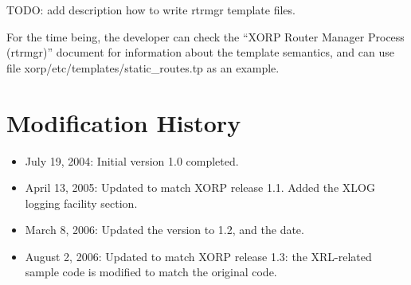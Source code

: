 \documentclass[11pt]{article}
\begin{document}
TODO: add description how to write rtrmgr template files.

For the time being, the developer can check the ``XORP Router Manager Process
(rtrmgr)'' document for information about the template semantics, and can use
file {\stt xorp/etc/templates/static\_routes.tp} as an example.

\newpage

\appendix
\section{Modification History}

\begin{itemize}

  \item July 19, 2004: Initial version 1.0 completed.

  \item April 13, 2005: Updated to match XORP release 1.1.
   Added the XLOG logging facility section.

  \item March 8, 2006: Updated the version to 1.2, and the date.

  \item August 2, 2006: Updated to match XORP release 1.3: the XRL-related
  sample code is modified to match the original code.

\end{itemize}




\end{document}
